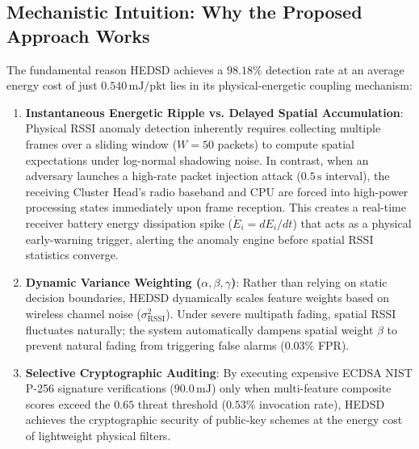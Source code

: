 \documentclass[conference]{IEEEtran}
\begin{document}
\subsection{Mechanistic Intuition: Why the Proposed Approach Works}
The fundamental reason HEDSD achieves a $98.18\%$ detection rate at an average energy cost of just $0.540\,\text{mJ/pkt}$ lies in its physical-energetic coupling mechanism:
\begin{enumerate}
    \item \textbf{Instantaneous Energetic Ripple vs. Delayed Spatial Accumulation}: Physical RSSI anomaly detection inherently requires collecting multiple frames over a sliding window ($W=50$ packets) to compute spatial expectations under log-normal shadowing noise. In contrast, when an adversary launches a high-rate packet injection attack ($0.5\,\text{s}$ interval), the receiving Cluster Head's radio baseband and CPU are forced into high-power processing states immediately upon frame reception. This creates a real-time receiver battery energy dissipation spike ($\dot{E}_i = dE_i/dt$) that acts as a physical early-warning trigger, alerting the anomaly engine before spatial RSSI statistics converge.
    \item \textbf{Dynamic Variance Weighting ($\alpha, \beta, \gamma$)}: Rather than relying on static decision boundaries, HEDSD dynamically scales feature weights based on wireless channel noise ($\sigma_{\text{RSSI}}^2$). Under severe multipath fading, spatial RSSI fluctuates naturally; the system automatically dampens spatial weight $\beta$ to prevent natural fading from triggering false alarms ($0.03\%$ FPR).
    \item \textbf{Selective Cryptographic Auditing}: By executing expensive ECDSA NIST P-256 signature verifications ($90.0\,\text{mJ}$) only when multi-feature composite scores exceed the $0.65$ threat threshold ($0.53\%$ invocation rate), HEDSD achieves the cryptographic security of public-key schemes at the energy cost of lightweight physical filters.
\end{enumerate}
\end{document}
